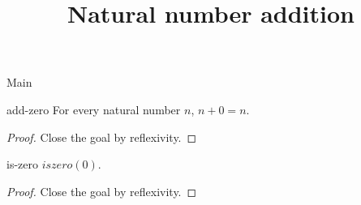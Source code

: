 \begin{lexlean}{Main}
\title{Natural number addition}

\begin{theorem}{add-zero}
\noaxioms
For every natural number \(n\), \(n + 0 = n\).
\begin{proof}
Close the goal by reflexivity.
\end{proof}
\end{theorem}

\begin{theorem}{is-zero}
\noaxioms
\(iszero(0)\).
\begin{proof}
Close the goal by reflexivity.
\end{proof}
\end{theorem}
\end{lexlean}
